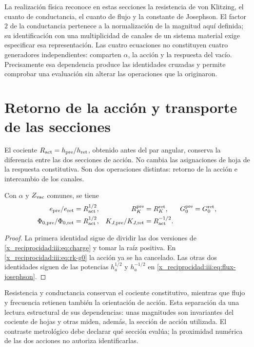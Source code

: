 La realización física reconoce en estas secciones la resistencia de von
Klitzing, el cuanto de conductancia, el cuanto de flujo y la constante de
Josephson. El factor $2$ de la conductancia pertenece a la normalización
de la magnitud aquí definida; su identificación con una multiplicidad de
canales de un sistema material exige especificar esa representación.
Las cuatro ecuaciones no constituyen cuatro generadores independientes:
comparten $\alpha$, la acción y la respuesta del vacío. Precisamente esa
dependencia produce las identidades cruzadas y permite comprobar una
evaluación sin alterar las operaciones que la originaron.

\section{Retorno de la acción y transporte de las secciones}

El cociente $R_{\rm act}=h_{\rm pre}/h_{\rm ret}$, obtenido antes del
par angular, conserva la diferencia entre las dos secciones de acción.
No cambia las asignaciones de hoja de la respuesta constitutiva. Son dos
operaciones distintas: retorno de la acción e intercambio de los canales.

\begin{proposition}
Con $\alpha$ y $Z_{\rm vac}$ comunes, se tiene
\begin{align}
 \frac{e_{\rm pre}}{e_{\rm ret}}&=R_{\rm act}^{1/2},
 &R_K^{\rm pre}&=R_K^{\rm ret},
 &G_0^{\rm pre}&=G_0^{\rm ret},\label{x_reciprocidad:iii:eq:charge-return}\\
 \frac{\Phi_{0,\rm pre}}{\Phi_{0,\rm ret}}&=R_{\rm act}^{1/2},
 &\frac{K_{J,\rm pre}}{K_{J,\rm ret}}&=R_{\rm act}^{-1/2}.
 \label{x_reciprocidad:iii:eq:flux-return}
\end{align}
\end{proposition}
\begin{proof}
La primera identidad sigue de dividir las dos versiones de
\eqref{x_reciprocidad:iii:eq:charge} y tomar la raíz positiva. En
\eqref{x_reciprocidad:iii:eq:rk-g0} la acción ya se ha cancelado. Las otras dos
identidades siguen de las potencias $h_a^{1/2}$ y $h_a^{-1/2}$ en
\eqref{x_reciprocidad:iii:eq:flux-josephson}.
\end{proof}

Resistencia y conductancia conservan el cociente constitutivo, mientras
que flujo y frecuencia retienen también la orientación de acción. Esta
separación da una lectura estructural de sus dependencias: unas magnitudes
son invariantes del cociente de hojas y otras miden, además, la sección de
acción utilizada. El contraste metrológico debe declarar qué sección evalúa;
la proximidad numérica de las dos acciones no autoriza identificarlas.

